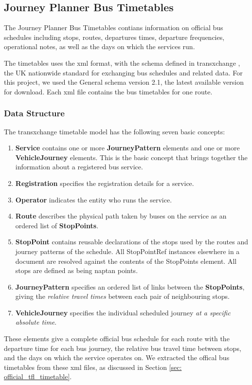 \subsection{Journey Planner Bus Timetables}
The Journey Planner Bus Timetables\cite{open_data_feeds_description}  contians information on official bus schedules including stops, routes, departures times, departure frequencies, operational notes, as well as the days on which the services run.

The timetables uses the \acrfull{xml} \cite{xml} format, with the schema defined in \gls{transxchange} \cite{transxchange}, the UK nationwide standard for exchanging bus schedules and related data. For this project, we used the General schema version 2.1\cite{transxchange_downloads_and_schema}\cite{transxchange_schema_2.1_xsd}, the latest available version for download. Each \acrshort{xml} file contains the bus timetables for one route.

\subsubsection{Data Structure}
The \gls{transxchange} timetable model has the following seven basic concepts\cite{transxchange_schema_guide}:

\begin{enumerate}
  \item \textbf{Service} contains one or more \textbf{JourneyPattern} elements and one or more \textbf{VehicleJourney} elements. This is the basic concept that brings together the information about a registered bus service.
  \item \textbf{Registration} specifies the registration details for a service.
  \item \textbf{Operator} indicates the entity who runs the service.
  \item \textbf{Route} describes the physical path taken by buses on the service as an ordered list of \textbf{StopPoints}.
  \item \textbf{StopPoint} contains reusable declarations of the stops used by the routes and journey patterns of the schedule. All StopPointRef instances elsewhere in a document are resolved against the contents of the StopPoints element. All stops are defined as being \gls{naptan} points.
  \item \textbf{JourneyPattern} specifies an ordered list of links between the \textbf{StopPoints}, giving the \emph{relative travel times} between each pair of neighbouring stops.
  \item \textbf{VehicleJourney} specifies the individual scheduled journey \emph{at a specific absolute time}.
\end{enumerate}

These elements give a complete official bus schedule for each route with the departure time for each bus journey, the relative bus travel time between stops, and the days on which the service operates on. We extracted the offical bus timetables from these \acrshort{xml} files, as discussed in Section \ref{sec: official_tfl_timetable}.
